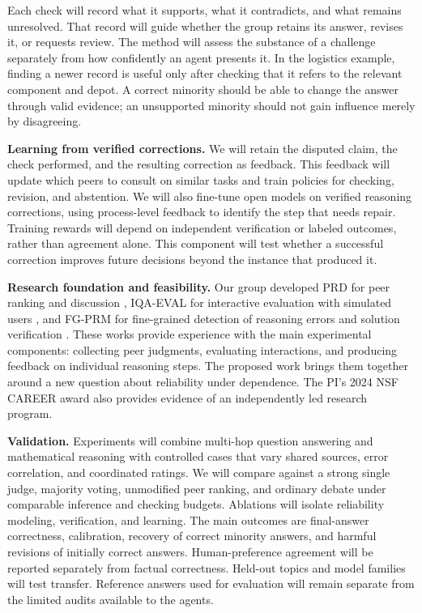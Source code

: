 \documentclass[12pt,letterpaper]{article}
\begin{document}
Each check will record what it supports, what it contradicts, and what remains unresolved. That record will guide whether the group retains its answer, revises it, or requests review. The method will assess the substance of a challenge separately from how confidently an agent presents it. In the logistics example, finding a newer record is useful only after checking that it refers to the relevant component and depot. A correct minority should be able to change the answer through valid evidence; an unsupported minority should not gain influence merely by disagreeing.

\textbf{Learning from verified corrections.} We will retain the disputed claim, the check performed, and the resulting correction as feedback. This feedback will update which peers to consult on similar tasks and train policies for checking, revision, and abstention. We will also fine-tune open models on verified reasoning corrections, using process-level feedback to identify the step that needs repair. Training rewards will depend on independent verification or labeled outcomes, rather than agreement alone. This component will test whether a successful correction improves future decisions beyond the instance that produced it.

\textbf{Research foundation and feasibility.} Our group developed PRD for peer ranking and discussion \cite{ref2}, IQA-EVAL for interactive evaluation with simulated users \cite{ref9}, and FG-PRM for fine-grained detection of reasoning errors and solution verification \cite{ref10}. These works provide experience with the main experimental components: collecting peer judgments, evaluating interactions, and producing feedback on individual reasoning steps. The proposed work brings them together around a new question about reliability under dependence. The PI's 2024 NSF CAREER award also provides evidence of an independently led research program.

\textbf{Validation.} Experiments will combine multi-hop question answering and mathematical reasoning with controlled cases that vary shared sources, error correlation, and coordinated ratings. We will compare against a strong single judge, majority voting, unmodified peer ranking, and ordinary debate under comparable inference and checking budgets. Ablations will isolate reliability modeling, verification, and learning. The main outcomes are final-answer correctness, calibration, recovery of correct minority answers, and harmful revisions of initially correct answers. Human-preference agreement will be reported separately from factual correctness. Held-out topics and model families will test transfer. Reference answers used for evaluation will remain separate from the limited audits available to the agents.
\end{document}
